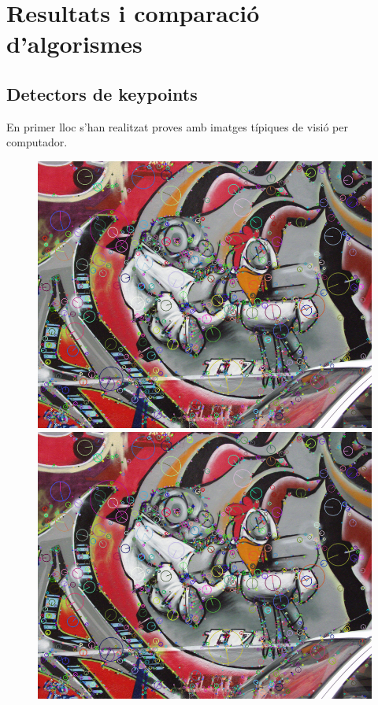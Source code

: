 \section{Resultats i comparació d'algorismes}
	\subsection{Detectors de keypoints}
	En primer lloc s'han realitzat proves amb imatges típiques de visió per computador.
		\begin{figure}[!htb]
				\includegraphics[width=\linewidth]{images/RobotKp}
				\label{fig:awesome_image1}
			\endminipage\hfill
				\includegraphics[width=\linewidth]{images/RobotKp}

\end{figure}
